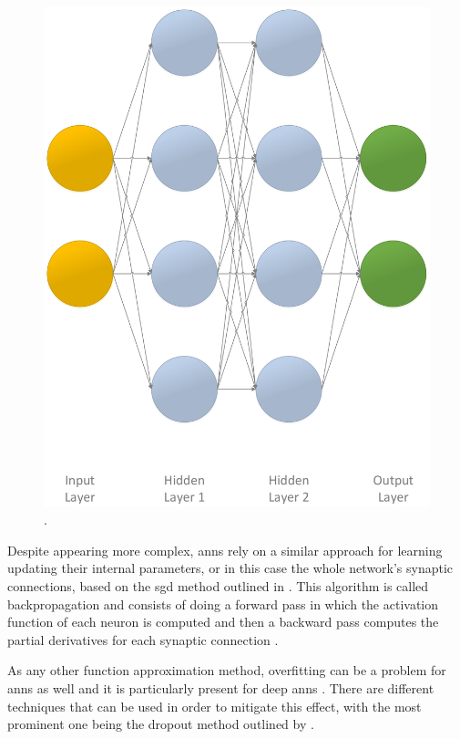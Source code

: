 \begin{figure}[!ht]
\begin{minipage}[b]{0.45\textwidth}
		\includegraphics[width=\textwidth]{img/ann_2h}
		\caption{.}
		\label{fig:ann_2h}
	\end{minipage}
\end{figure}

Despite appearing more complex, \glspl{ann} rely on a similar approach for learning \ie updating their internal parameters, or in this case the whole network's synaptic connections, based on the \gls{sgd} method outlined in  \citep[p. 217]{Sutton2017}. This algorithm is called backpropagation and consists of doing a forward pass in which the activation function of each neuron is computed and then a backward pass computes the partial derivatives for each synaptic connection \citep[p. 218]{Sutton2017}.

As any other function approximation method, overfitting can be a problem for \glspl{ann} as well and it is particularly present for deep \glspl{ann} \citep[p. 218]{Sutton2017}. There are different techniques that can be used in order to mitigate this effect, with the most prominent one being the dropout method outlined by \citet{Srivastava2014}.

